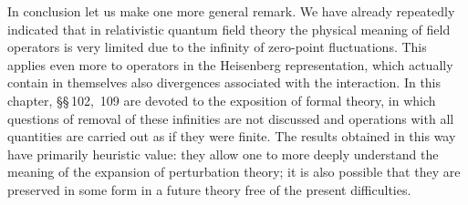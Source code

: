 In conclusion let us make one more general remark. We have already repeatedly indicated that in relativistic quantum field theory the physical meaning of field operators is very limited due to the infinity of zero-point fluctuations. This applies even more to operators in the Heisenberg representation, which actually contain in themselves also divergences associated with the interaction. In this chapter, \S\S\,102,~109 are devoted to the exposition of formal theory, in which questions of removal of these infinities are not discussed and operations with all quantities are carried out as if they were finite. The results obtained in this way have primarily heuristic value: they allow one to more deeply understand the meaning of the expansion of perturbation theory; it is also possible that they are preserved in some form in a future theory free of the present difficulties.
